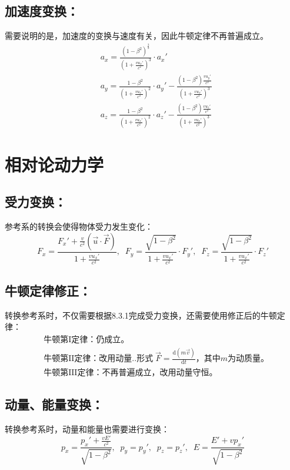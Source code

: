 \documentclass[zihao=-4,UTF8]{report}
\begin{document}
\subsection{加速度变换：}
需要说明的是，加速度的变换与速度有关，因此牛顿定律不再普遍成立。
\begin{align*}
  &a_x=\frac{(1-\beta^2)^{\frac{3}{2}}}{(1+\frac{vu_x'}{c^2})^3}\cdot a_x'\\
  &a_y=\frac{1-\beta^2}{(1+\frac{vu_x'}{c^2})^2}\cdot a_y'-\frac{(1-\beta^2)\frac{vu_y'}{c^2}}{(1+\frac{vu_x'}{c^2})^3}\\
  &a_z=\frac{1-\beta^2}{(1+\frac{vu_x'}{c^2})^2}\cdot a_z'-\frac{(1-\beta^2)\frac{vu_z'}{c^2}}{(1+\frac{vu_x'}{c^2})^3}
\end{align*}

\section{相对论动力学}

\subsection{受力变换：}
参考系的转换会使得物体受力发生变化：
\begin{equation*}
  F_x=\frac{F_x'+\frac{v}{c^2}(\vec{u}\cdot \vec{F})}{1+\frac{vu_x'}{c^2}},\;\;
  F_y = \frac{\sqrt{1-\beta^2}}{1+\frac{vu_x'}{c^2}}\cdot F_y',\;\;
  F_z = \frac{\sqrt{1-\beta^2}}{1+\frac{vu_x'}{c^2}}\cdot F_z'
\end{equation*}

\subsection{牛顿定律修正：}
转换参考系时，不仅需要根据8.3.1完成受力变换，还需要使用修正后的牛顿定律：
\begin{align*}
  &\text{牛顿第I定律：仍成立。}\\
  &\text{牛顿第II定律：改用动量..形式}\;\vec{F}=\frac{\mathrm{d} (m\vec{v})  }{\mathrm{d} t}\text{，其中$m$为动质量。}\\
  &\text{牛顿第III定律：不再普遍成立，改用动量守恒。}
\end{align*}

\subsection{动量、能量变换：}
转换参考系时，动量和能量也需要进行变换：
\begin{equation*}
  p_x=\frac{p_x'+\frac{vE'}{c^2}}{\sqrt{1-\beta^2}},\;\;p_y=p_y',\;\;p_z=p_z',\;\;E=\frac{E'+vp_x'}{\sqrt{1-\beta^2}}
\end{equation*}
\end{document}
